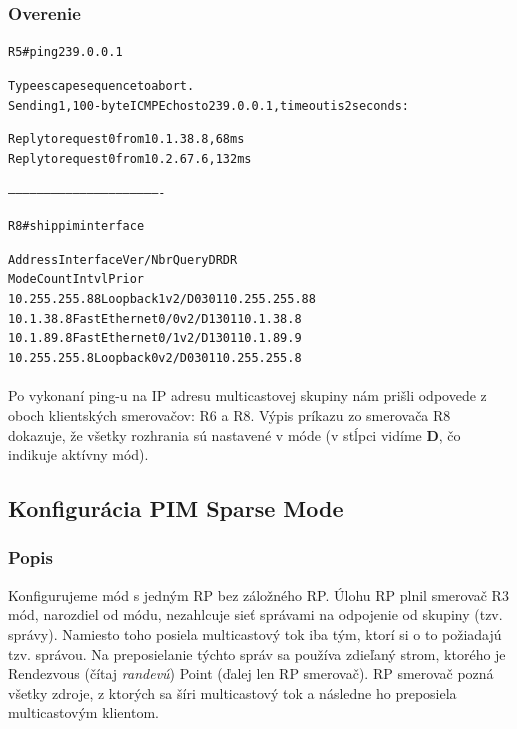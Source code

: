 \documentclass[12pt,twoside,a4paper]{report}
\begin{document}
\subsubsection{Overenie}

\noindent
{\selectfont
\begin{small}
\begin{alltt}
R5#ping 239.0.0.1

Type escape sequence to abort.
Sending 1, 100-byte ICMP Echos to 239.0.0.1, timeout is 2 seconds:

Reply to request 0 from 10.1.38.8, 68 ms
Reply to request 0 from 10.2.67.6, 132 ms


----------------------------------------------------------------


R8#sh ip pim interface

Address          Interface         Ver/   Nbr    Query  DR     DR
                                   Mode   Count  Intvl  Prior
10.255.255.88    Loopback1         v2/D   0      30     1      10.255.255.88
10.1.38.8        FastEthernet0/0   v2/D   1      30     1      10.1.38.8
10.1.89.8        FastEthernet0/1   v2/D   1      30     1      10.1.89.9
10.255.255.8     Loopback0         v2/D   0      30     1      10.255.255.8

\end{alltt}
\end{small}
}

\paragraph{}
Po vykonaní ping-u na IP adresu multicastovej skupiny nám prišli odpovede z oboch klientských smerovačov: R6 a R8. Výpis príkazu  zo smerovača R8 dokazuje, že všetky rozhrania sú nastavené v  móde (v stĺpci  vidíme \textbf{D}, čo indikuje aktívny  mód).













\subsection{Konfigurácia PIM Sparse Mode}
\subsubsection{Popis}
Konfigurujeme  mód s jedným RP bez záložného RP. Úlohu RP plnil smerovač R3  mód, narozdiel od  módu, nezahlcuje sieť správami na odpojenie od skupiny (tzv.  správy). Namiesto toho posiela multicastový tok iba tým, ktorí si o to požiadajú tzv.  správou. Na preposielanie týchto správ sa používa zdieľaný strom, ktorého  je Rendezvous (čítaj \textit{randevú}) Point (ďalej len RP smerovač). RP smerovač pozná všetky zdroje, z ktorých sa šíri  multicastový tok a následne ho preposiela multicastovým klientom.
\end{document}
